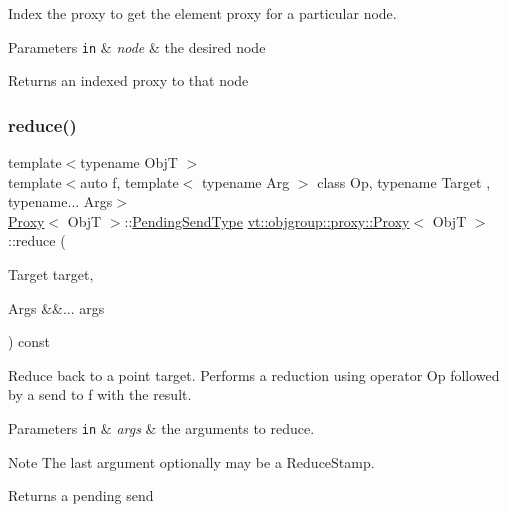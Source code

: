 Index the proxy to get the element proxy for a particular node. 


\begin{DoxyParams}[1]{Parameters}
\mbox{\tt in}  & {\em node} & the desired node\\
\hline
\end{DoxyParams}
\begin{DoxyReturn}{Returns}
an indexed proxy to that node 
\end{DoxyReturn}
\mbox{\label{structvt_1_1objgroup_1_1proxy_1_1_proxy_a10836524197347f63d5507f08d871e4f}} 
\subsubsection{\texorpdfstring{reduce()}{reduce()}\hspace{0.1cm}{\footnotesize\ttfamily [1/7]}}
{\footnotesize\ttfamily template$<$typename ObjT $>$ \\
template$<$auto f, template$<$ typename Arg $>$ class Op, typename Target , typename... Args$>$ \\
\hyperlink{structvt_1_1objgroup_1_1proxy_1_1_proxy}{Proxy}$<$ ObjT $>$\+::\hyperlink{structvt_1_1objgroup_1_1proxy_1_1_proxy_a1bdf8713203531d306702a024872bb08}{Pending\+Send\+Type} \hyperlink{structvt_1_1objgroup_1_1proxy_1_1_proxy}{vt\+::objgroup\+::proxy\+::\+Proxy}$<$ ObjT $>$\+::reduce (\begin{DoxyParamCaption}\item[{Target}]{target,  }\item[{Args \&\&...}]{args }\end{DoxyParamCaption}) const}



Reduce back to a point target. Performs a reduction using operator {\ttfamily Op} followed by a send to {\ttfamily f} with the result. 


\begin{DoxyParams}[1]{Parameters}
\mbox{\tt in}  & {\em args} & the arguments to reduce. \\
\hline
\end{DoxyParams}
\begin{DoxyNote}{Note}
The last argument optionally may be a {\ttfamily Reduce\+Stamp}.
\end{DoxyNote}
\begin{DoxyReturn}{Returns}
a pending send 
\end{DoxyReturn}
\mbox{\label{structvt_1_1objgroup_1_1proxy_1_1_proxy_a96eb24e65cfda56210ca202010b7f172}} 
